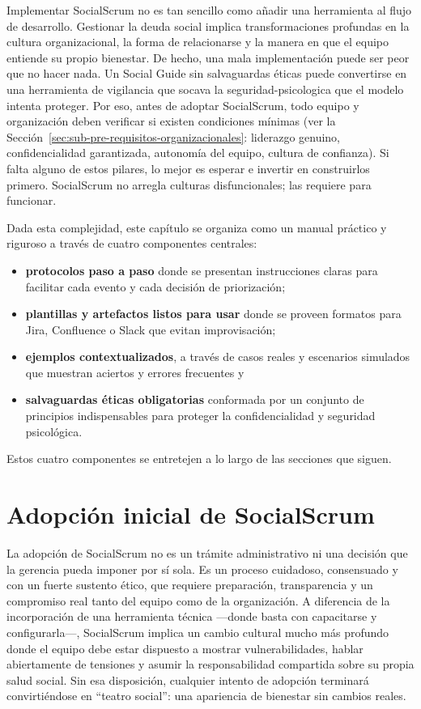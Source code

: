 Implementar SocialScrum no es tan sencillo como añadir una herramienta al flujo de desarrollo. Gestionar la deuda social implica transformaciones profundas en la cultura organizacional, la forma de relacionarse y la manera en que el equipo entiende su propio bienestar. De hecho, una mala implementación puede ser peor que no hacer nada. Un Social Guide sin salvaguardas éticas puede convertirse en una herramienta de vigilancia que socava la \gls{seguridad-psicologica} que el modelo intenta proteger. Por eso, antes de adoptar SocialScrum, todo equipo y organización deben verificar si existen condiciones mínimas (ver la Sección~\ref{sec:sub-pre-requisitos-organizacionales}: liderazgo genuino, confidencialidad garantizada, autonomía del equipo, cultura de confianza). Si falta alguno de estos pilares, lo mejor es esperar e invertir en construirlos primero. SocialScrum no arregla culturas disfuncionales; las requiere para funcionar.

Dada esta complejidad, este capítulo se organiza como un manual práctico y riguroso a través de cuatro componentes centrales:
\begin{itemize}
    \item \textbf{protocolos paso a paso} donde se presentan instrucciones claras para facilitar cada evento y cada decisión de priorización;
    \item \textbf{plantillas y artefactos listos para usar} donde se proveen formatos para Jira, Confluence o Slack que evitan improvisación;
    \item \textbf{ejemplos contextualizados}, a través de casos reales y escenarios simulados que muestran aciertos y errores frecuentes y
    \item \textbf{salvaguardas éticas obligatorias} conformada por un conjunto de principios indispensables para proteger la confidencialidad y seguridad psicológica.
\end{itemize}
Estos cuatro componentes se entretejen a lo largo de las secciones que siguen.

\section{Adopción inicial de SocialScrum}
\label{sec:adopcion-inicial}

La adopción de SocialScrum no es un trámite administrativo ni una decisión que la gerencia pueda imponer por sí sola. Es un proceso cuidadoso, consensuado y con un fuerte sustento ético, que requiere preparación, transparencia y un compromiso real tanto del equipo como de la organización. A diferencia de la incorporación de una herramienta técnica —donde basta con capacitarse y configurarla—, SocialScrum implica un cambio cultural mucho más profundo donde el equipo debe estar dispuesto a mostrar vulnerabilidades, hablar abiertamente de tensiones y asumir la responsabilidad compartida sobre su propia salud social. Sin esa disposición, cualquier intento de adopción terminará convirtiéndose en ``teatro social'': una apariencia de bienestar sin cambios reales.

